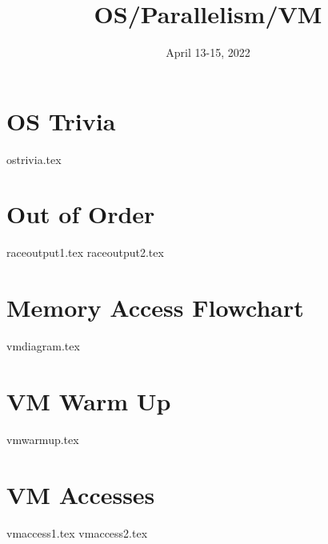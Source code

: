 \documentclass[11pt]{exam}
\title{OS/Parallelism/VM}
\date{April 13-15, 2022}
\begin{document}
\maketitle

\section{OS Trivia}
{ostrivia.tex}
\newpage

\section{Out of Order}
\begin{questions}
{raceoutput1.tex}
{raceoutput2.tex}
\end{questions}
\newpage

\section{Memory Access Flowchart}
{vmdiagram.tex}
\newpage

\section{VM Warm Up}
\begin{questions}
{vmwarmup.tex}
\end{questions}
\newpage


\section{VM Accesses}
\begin{questions}
{vmaccess1.tex}
{vmaccess2.tex}
\end{questions}
\newpage

\end{document}
